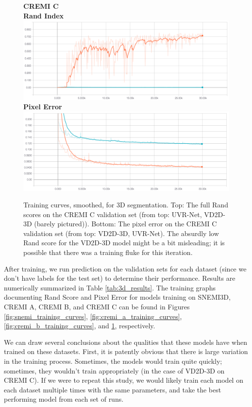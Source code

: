 \begin{figure}
\centering
\textbf{CREMI C} \\
\textbf{Rand Index}
\includegraphics[width=\textwidth]{img/cremi_c_rand.png} \\
\textbf{Pixel Error}
\includegraphics[width=\textwidth]{img/cremi_c_px_err.png}

\caption[Training curves for 3D segmentation for CREMI C]{Training curves, smoothed, for 3D segmentation. Top: The full Rand scores on the CREMI C validation set (from top: UVR-Net, VD2D-3D (barely pictured)). Bottom: The pixel error on the CREMI C validation set (from top: VD2D-3D, UVR-Net). The absurdly low Rand score for the VD2D-3D model might be a bit misleading; it is possible that there was a training fluke for this iteration.}
\label{fig:cremi_c_training_curves}

\end{figure}


After training, we run prediction on the validation sets for each dataset (since we don't have labels for the test set) to determine their performance. Results are numerically summarized in Table \ref{tab:3d_results}. The training graphs documenting Rand Score and Pixel Error for models training on SNEMI3D, CREMI A, CREMI B, and CREMI C can be found in Figures \ref{fig:snemi_training_curves}, \ref{fig:cremi_a_training_curves}, \ref{fig:cremi_b_training_curves}, and \ref{fig:cremi_c_training_curves}, respectively. 

We can draw several conclusions about the qualities that these models have when trained on these datasets. First, it is patently obvious that there is large variation in the training process. Sometimes, the models would train quite quickly; sometimes, they wouldn't train appropriately (in the case of VD2D-3D on CREMI C). If we were to repeat this study, we would likely train each model on each dataset multiple times with the same parameters, and take the best performing model from each set of runs. 

